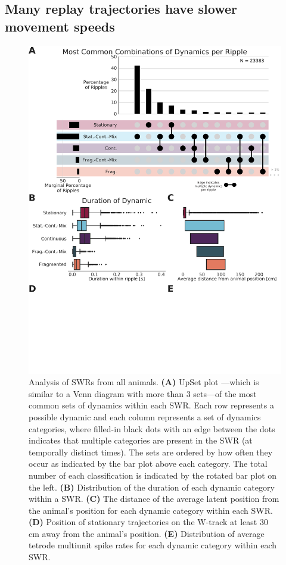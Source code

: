 \documentclass[times, twoside]{zHenriquesLab-StyleBioRxiv}
\begin{document}
\subsection*{Many replay trajectories have slower movement speeds}
\begin{figure}%
\centering
\includegraphics[width=0.80\linewidth]{figures/Figure5/Figure5_v3}
\caption{
Analysis of SWRs from all animals. \textbf{(A)} UpSet plot \cite{LexUpSetVisualizationIntersecting2014}---which is similar to a Venn diagram with more than 3 sets---of the most common sets of dynamics within each SWR. Each row represents a possible dynamic and each column represents a set of dynamics categories, where filled-in black dots with an edge between the dots indicates that multiple categories are present in the SWR (at temporally distinct times). The sets are ordered by how often they occur as indicated by the bar plot above each category. The total number of each classification is indicated by the rotated bar plot on the left. \textbf{(B)} Distribution of the duration of each dynamic category within a SWR. \textbf{(C)} The distance of the average latent position from the animal's position for each dynamic category within each SWR. \textbf{(D)} Position of stationary trajectories on the W-track at least 30 cm away from the animal's position. \textbf{(E)} Distribution of average tetrode multiunit spike rates for each dynamic category within each SWR.
}
\label{5}
\end{figure}
\end{document}
